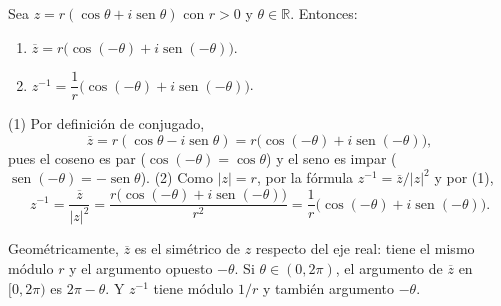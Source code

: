\begin{proposicion}[{title={Conjugado e inverso en forma trigonométrica}}]
Sea $z=r(\cos\theta+i\operatorname{sen}\theta)$ con $r>0$ y $\theta\in\mathbb{R}$.
Entonces:
\begin{enumerate}
    \item $\overline{z}=r\bigl(\cos(-\theta)+i\operatorname{sen}(-\theta)\bigr)$.
    \item $z^{-1}=\dfrac{1}{r}\bigl(\cos(-\theta)+i\operatorname{sen}(-\theta)\bigr)$.
\end{enumerate}
\end{proposicion}
\begin{demostracion}
(1) Por definición de conjugado,
\[
\overline{z}=r(\cos\theta-i\operatorname{sen}\theta)
=r\bigl(\cos(-\theta)+i\operatorname{sen}(-\theta)\bigr),
\]
pues el coseno es par ($\cos(-\theta)=\cos\theta$) y el seno es impar
($\operatorname{sen}(-\theta)=-\operatorname{sen}\theta$).
(2) Como $|z|=r$, por la fórmula $z^{-1}=\overline{z}/|z|^2$ y por (1),
\[
z^{-1}=\frac{\overline{z}}{|z|^2}
=\frac{r\bigl(\cos(-\theta)+i\operatorname{sen}(-\theta)\bigr)}{r^2}
=\frac{1}{r}\bigl(\cos(-\theta)+i\operatorname{sen}(-\theta)\bigr).
\]
\end{demostracion}
\begin{nota}{}
Geométricamente, $\overline{z}$ es el simétrico de $z$ respecto del eje real: tiene
el mismo módulo $r$ y el argumento opuesto $-\theta$. Si $\theta\in(0,2\pi)$,
el argumento de $\overline{z}$ en $[0,2\pi)$ es $2\pi-\theta$. Y $z^{-1}$ tiene
módulo $1/r$ y también argumento $-\theta$.
\end{nota}
